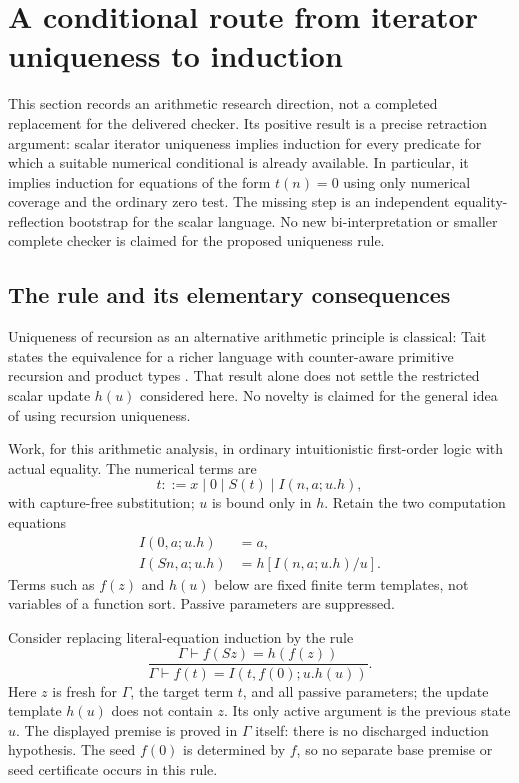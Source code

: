 \section{A conditional route from iterator uniqueness to induction}
\label{sec:uniqueness-research}

This section records an arithmetic research direction, not a completed
replacement for the delivered checker.  Its positive result is a precise
retraction argument: scalar iterator uniqueness implies induction for
every predicate for which a suitable numerical conditional is already
available.  In particular, it implies induction for equations of the
form $t(n)=0$ using only numerical coverage and the ordinary zero test.
The missing step is an independent equality-reflection bootstrap for
the scalar language.  No new bi-interpretation or smaller complete
checker is claimed for the proposed uniqueness rule.

\subsection{The rule and its elementary consequences}

Uniqueness of recursion as an alternative arithmetic principle is
classical: Tait states the equivalence for a richer language with
counter-aware primitive recursion and product types \cite{tait}.
That result alone does not settle the restricted scalar update
$h(u)$ considered here. No novelty is claimed for the general idea
of using recursion uniqueness.

Work, for this arithmetic analysis, in ordinary intuitionistic
first-order logic with actual equality.  The numerical terms are
\[
 t ::= x\mid 0\mid S(t)\mid I(n,a;u.h),
\]
with capture-free substitution; $u$ is bound only in $h$.  Retain the
two computation equations
\begin{align*}
 I(0,a;u.h)&=a,\\
 I(Sn,a;u.h)&=h[I(n,a;u.h)/u].
\end{align*}
Terms such as $f(z)$ and $h(u)$ below are fixed finite term templates,
not variables of a function sort.  Passive parameters are suppressed.

Consider replacing literal-equation induction by the rule
\[
 \frac{\Gamma\vdash f(Sz)=h(f(z))}
      {\Gamma\vdash f(t)=I(t,f(0);u.h(u))}.
 \tag{UR}\label{rule:scalar-ur}
\]
Here $z$ is fresh for $\Gamma$, the target term $t$, and all passive
parameters; the update template $h(u)$ does not contain $z$.  Its only
active argument is the previous state $u$.  The displayed premise is
proved in $\Gamma$ itself: there is no discharged induction hypothesis.
The seed $f(0)$ is determined by $f$, so no separate base premise or
seed certificate occurs in this rule.

